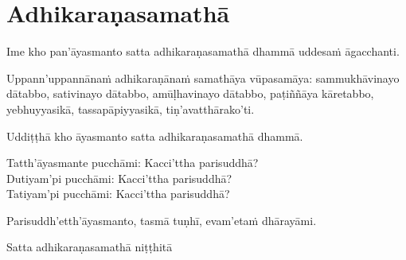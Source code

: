 
\section{Adhikaraṇasamathā}
\label{adhi}

\begin{intro}
	Ime kho pan'āyasmanto satta adhikaraṇasamathā dhammā uddesaṁ āgacchanti.
\end{intro}

Uppann'uppannānaṁ adhikaraṇānaṁ samathāya vūpasamāya: sammukhāvinayo dātabbo, sativinayo dātabbo, amūḷhavinayo dātabbo, paṭiññāya kāretabbo, yebhuyyasikā, tassapāpiyyasikā, tiṇ'avatthārako'ti.

\medskip

\begin{center}
	Uddiṭṭhā kho āyasmanto satta adhikaraṇasamathā dhammā.

	\smallskip

	Tatth'āyasmante pucchāmi: Kacci'ttha parisuddhā?\\
	Dutiyam'pi pucchāmi: Kacci'ttha parisuddhā?\\
	Tatiyam'pi pucchāmi: Kacci'ttha parisuddhā?

	\smallskip

	Parisuddh'etth'āyasmanto, tasmā tuṇhī, evam'etaṁ dhārayāmi.
\end{center}

\begin{outro}
	Satta adhikaraṇasamathā niṭṭhitā
\end{outro}

\clearpage

